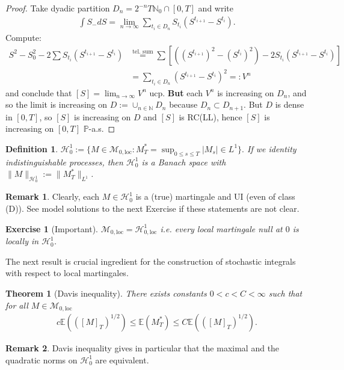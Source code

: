 \documentclass[12pt,a4paper, twoside]{article}
\newtheorem{thm}{Theorem}[section]
\newtheorem{defn}{Definition}[section]
\newtheorem{exe}{Exercise}[section]
\theoremstyle{definition}
\newtheorem{rem}{Remark}[section]
\newcommand{\EE}{\mathbb{E}} %
\newcommand{\PP}{\mathbb{P}} %
\begin{document}
\begin{proof}
Take dyadic partition $D_n = 2^{-n} T \mathbb{N}_0 \cap [0,T]$ and write 
\begin{align*}
\int S_- dS = \lim_{n \to \infty} \sum_{t_i \in D_n} S_{t_i} ( S^{t_{i+1}}-S^{t_i}).
\end{align*}
Compute:
\begin{align*}
S^2-S_0^2- 2\sum S_{t_i} (S^{t_{i+1}}-S^{t_i}) &\overset{\text{tel. sum}}= \sum \left[ ((S^{t_{i+1}})^2-(S^{t_i})^2)-2 S_{t_i}(S^{t_{i+1}}-S^{t_i}) \right] \\
& = \sum_{t_i \in D_n} (S^{t_{i+1}}-S^{t_i})^2 =:V^n
\end{align*}
and conclude that $[S] = \lim_{n \to \infty} V^n$ ucp. \textbf{But} each $V^n$ is increasing on $D_n$, and so the limit is increasing on $D:= \cup_{n \in \mathbb{N}} D_n$ because $D_n \subset D_{n+1}$. But $D$ is dense in $[0,T]$, so $[S]$ is increasing on $D$ and $[S]$ is RC(LL),  hence $[S]$ is increasing on $[0,T] $ $\PP$-a.s.
\end{proof}
\newpage
\begin{defn} $\mathcal{H}_0^1:= \{ M \in \mathcal{M}_{0, \text{loc}} : M_T^* = \sup_{0 \leq s \leq T} |M_s| \in L^1\}.$ If we identity indistinguishable processes, then $\mathcal{H}_0^1$ is a Banach space with $\|M\|_{\mathcal{H}_0^1} := \| M_T^*\|_{L^1}$. 
\end{defn}
\begin{rem} Clearly, each $M \in \mathcal{H}_0^1$ is a (true) martingale and UI (even of class (D)). See model solutions to the next Exercise if these statements are not clear.
\end{rem}
\begin{exe}[Important] \label{ex9} $\mathcal{M}_{0, \text{loc}} = \mathcal{H}_{0, \text{loc}}^1$ i.e. every local martingale null at $0$ is locally in $\mathcal{H}_0^1$. 
\end{exe}
The next result is crucial ingredient for the construction of stochastic integrals with respect to local martingales. 
\begin{thm}[Davis inequality] \label{T37} There exists constants $0 <c<C < \infty$ such that for all $M \in \mathcal{M}_{0, \text{loc}}$ 
\begin{align*}
c \EE(([M]_T)^{1/2})  \leq \EE(M_T^*) \leq C \EE(([M]_T)^{1/2}).
\end{align*}
\end{thm}
\begin{rem} Davis inequality gives in particular that the maximal and the quadratic norms on $\mathcal{H}_0^1$ are equivalent.
\end{rem}
\end{document}
